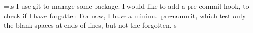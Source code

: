 \documentclass[a4paper, oneside, notitlepage, 12pt]{article}
\begin{document}
 \renewcommand*{\do@line}{%
  {\vbadness=10000
   \splittopskip=\z@
   \do@linehook
\l@demptyd@ta
   \global\setbox\one@line=\vsplit\raw@text to\baselineskip}%
  \unvbox\one@line \global\setbox\one@line=\lastbox
  \getline@num
  \IfStrEq{\led@pb@setting}{before}{\led@check@pb\led@check@nopb}{}
  \ifnum\@lock>\@ne
    \inserthangingsymboltrue
  \else
    \inserthangingsymbolfalse
  \fi
  \check@pb@in@verse
  \affixline@num
  \affixpstart@num
  \numdef{\tmp}{\c@pstart}%
  \ifnumequal{1}{\tmp}{\csuse{lsection@\tmp}}{
  \hb@xt@ \linewidth{\do@insidelinehook\l@dld@ta\add@inserts\affixside@note
    \l@dlsn@te
    {\ledllfill\hb@xt@ \wd\one@line{\new@line\inserthangingsymbol \l@dunhbox@line{\one@line}}\ledrlfill\l@drd@ta%
    \l@drsn@te
  }}}
  \IfStrEq{\led@pb@setting}{after}{\led@check@pb\led@check@nopb}{}
  }%
\def\led@section#1#2{\global\csdef{ledsection@#2}{\section{#1}}}

\beginnumbering
\immediate\openout\ledsec@out=\jobname.s
\pstart
{}
\pend
\pstart
I use git to manage some package.
I would like to add a pre-commit hook, to check if I have forgotten
For now, I have a minimal pre-commit, which test only the blank spaces at ends of lines, but not the forgotten.
\pend
\pstart
s
\pend
  \immediate\closeout\ledsec@out

\endnumbering
\end{document}
